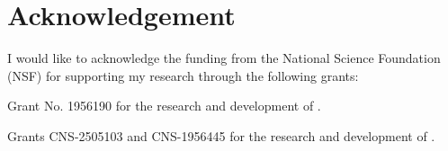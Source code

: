 \chapter{Acknowledgement} 
\label{ch:funding}

I would like to acknowledge the funding from the National Science Foundation (NSF) for supporting my research through the following grants:
\squishlist
    \item Grant No. 1956190 for the research and development of \livo.
    \item Grants CNS-2505103 and CNS-1956445 for the research and development of \gsnfs.
\squishend
